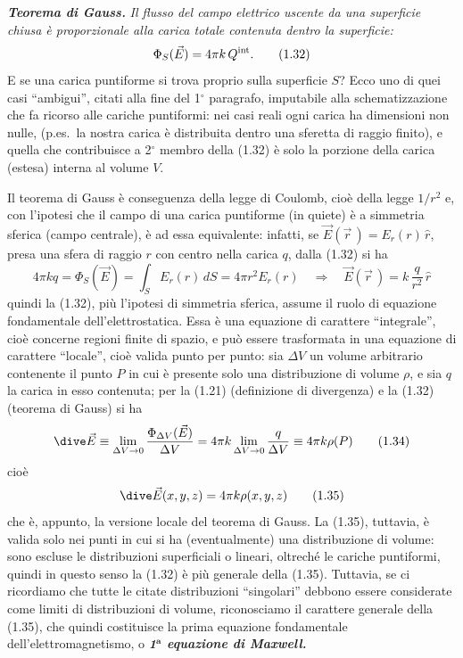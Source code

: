 \textbf{\textit{Teorema di Gauss.}} \textit{Il flusso del campo elettrico
uscente da una superficie chiusa \`e proporzionale alla carica totale contenuta
dentro la superficie:}
\begin{equation}
  \Phi_S(\vec E)=4\pi k\,Q^{\rm int}.
  \tag{1.32}
\end{equation}
E se una carica puntiforme si trova proprio sulla superficie $S$? Ecco uno di
quei casi ``ambigui'', citati alla fine del 1$^\circ$ paragrafo, imputabile alla
schematizzazione che
fa ricorso alle cariche puntiformi: nei casi reali ogni carica ha dimensioni non
nulle, (p.es.\ la nostra carica \`e distribuita dentro una sferetta di raggio
finito), e quella che contribuisce a 2$^\circ$ membro della (1.32) \`e solo la
porzione della carica (estesa) interna al volume $V$.

Il teorema di Gauss \`e conseguenza della legge di Coulomb, cio\`e della legge
$1/r^2$ e, con l'ipotesi che il campo di una carica puntiforme (in quiete) \`e a
simmetria sferica (campo centrale), \`e ad essa equivalente: infatti, se
$\vec E(\vec r\,)=E_r(r)\,\hat r$, presa una sfera di raggio $r$ con centro
nella carica $q$, dalla (1.32) si ha
\begin{equation}
  4\pi kq=\Phi_S(\vec E)=\int_S E_r(r)\,dS=4\pi r^2E_r(r)
  \quad\Rightarrow\quad\vec E(\vec r\,)=k\,\frac{q}{r^2}\,\hat r
  \tag{1.33}
\end{equation}
quindi la (1.32), pi\`u l'ipotesi di simmetria sferica, assume il ruolo di
equazione fondamentale dell'elettrostatica. Essa \`e una equazione di carattere
``integrale'', cio\`e concerne regioni finite di spazio, e pu\`o essere
trasformata in una equazione di carattere ``locale'', cio\`e valida punto per
punto: sia $\Delta V$ un volume arbitrario contenente il punto $P$ in cui \`e
presente solo una distribuzione di volume $\rho$, e sia $q$ la carica in esso
contenuta; per la (1.21) (definizione di divergenza) e la (1.32) (teorema di
Gauss) si ha
\begin{equation}
  \dive\vec E\equiv\lim_{\Delta V\to0}\frac{\Phi_{\Delta V}(\vec E)}{\Delta V}
  =4\pi k\lim_{\Delta V\to0}\frac{q}{\Delta V}\equiv4\pi k\rho(P)
  \tag{1.34}
\end{equation}
cio\`e
\begin{equation}
  \dive\vec E(x,y,z)=4\pi k\rho(x,y,z)
  \tag{1.35}
\end{equation}
che \`e, appunto, la versione locale del teorema di Gauss. La (1.35), tuttavia,
\`e valida solo nei punti in cui si ha (eventualmente) una distribuzione di
volume: sono escluse le distribuzioni superficiali o lineari, oltrech\'e le
cariche puntiformi, quindi in questo senso la (1.32) \`e pi\`u generale della
(1.35). Tuttavia, se ci ricordiamo che tutte le citate distribuzioni
``singolari'' debbono essere considerate come limiti di distribuzioni di volume,
riconosciamo il carattere generale della (1.35), che quindi costituisce la prima
equazione fondamentale dell'elettromagnetismo, o
\textbf{\textit{1$^{\mathbf{a}}$ equazione di Maxwell.}}

